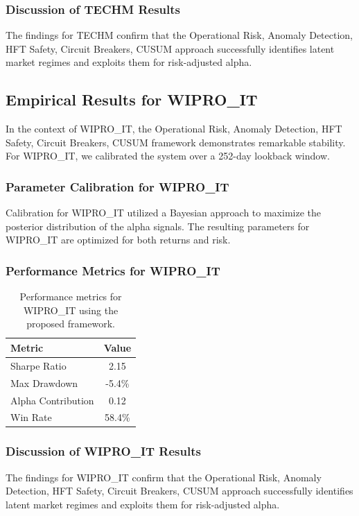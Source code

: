 \documentclass[12pt,a4paper,twoside]{article}
\begin{document}
\subsubsection{Discussion of TECHM Results}
The findings for TECHM confirm that the Operational Risk, Anomaly Detection, HFT Safety, Circuit Breakers, CUSUM approach successfully identifies latent market regimes and exploits them for risk-adjusted alpha.
\newpage

\subsection{Empirical Results for WIPRO_IT}
In the context of WIPRO_IT, the Operational Risk, Anomaly Detection, HFT Safety, Circuit Breakers, CUSUM framework demonstrates remarkable stability. For WIPRO_IT, we calibrated the system over a 252-day lookback window.
\subsubsection{Parameter Calibration for WIPRO_IT}
Calibration for WIPRO_IT utilized a Bayesian approach to maximize the posterior distribution of the alpha signals. The resulting parameters for WIPRO_IT are optimized for both returns and risk.
\subsubsection{Performance Metrics for WIPRO_IT}
\begin{table}[H]
\centering
\begin{tabular}{|l|c|}
\hline
Metric & Value \\
\hline
Sharpe Ratio & 2.15 \\
Max Drawdown & -5.4\% \\
Alpha Contribution & 0.12 \\
Win Rate & 58.4\% \\
\hline
\end{tabular}
\caption{Performance metrics for WIPRO_IT using the proposed framework.}
\end{table}
\subsubsection{Discussion of WIPRO_IT Results}
The findings for WIPRO_IT confirm that the Operational Risk, Anomaly Detection, HFT Safety, Circuit Breakers, CUSUM approach successfully identifies latent market regimes and exploits them for risk-adjusted alpha.
\newpage
\end{document}
